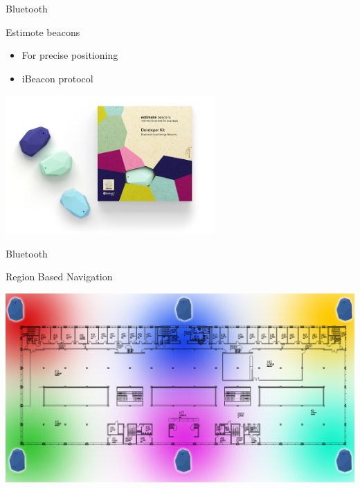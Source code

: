 \documentclass[9pt]{beamer}
\begin{document}
\begin{frame}{Bluetooth}
	
	{\large Estimote beacons}
	\bigskip
	\begin{itemize}
		\item For precise positioning
		\item iBeacon protocol
	\end{itemize}
	\begin{center}
	
		\includegraphics[width=0.6\textwidth]{box_devkit}
	
	\end{center}

\end{frame}

\begin{frame}{Bluetooth}
	
	\large Region Based Navigation
	\begin{center}
	
		\includegraphics[width=\textwidth]{regions}
	
	\end{center}

\end{frame}
\end{document}
